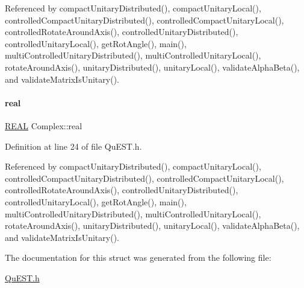 Referenced by compact\+Unitary\+Distributed(), compact\+Unitary\+Local(), controlled\+Compact\+Unitary\+Distributed(), controlled\+Compact\+Unitary\+Local(), controlled\+Rotate\+Around\+Axis(), controlled\+Unitary\+Distributed(), controlled\+Unitary\+Local(), get\+Rot\+Angle(), main(), multi\+Controlled\+Unitary\+Distributed(), multi\+Controlled\+Unitary\+Local(), rotate\+Around\+Axis(), unitary\+Distributed(), unitary\+Local(), validate\+Alpha\+Beta(), and validate\+Matrix\+Is\+Unitary().

\mbox{\label{structComplex_a479ad939835457595fcca3ca55c06283}} 
\paragraph{\texorpdfstring{real}{real}}
{\footnotesize\ttfamily \mbox{\hyperlink{QuEST__precision_8h_a4b654506f18b8bfd61ad2a29a7e38c25}{R\+E\+AL}} Complex\+::real}



Definition at line 24 of file Qu\+E\+S\+T.\+h.



Referenced by compact\+Unitary\+Distributed(), compact\+Unitary\+Local(), controlled\+Compact\+Unitary\+Distributed(), controlled\+Compact\+Unitary\+Local(), controlled\+Rotate\+Around\+Axis(), controlled\+Unitary\+Distributed(), controlled\+Unitary\+Local(), get\+Rot\+Angle(), main(), multi\+Controlled\+Unitary\+Distributed(), multi\+Controlled\+Unitary\+Local(), rotate\+Around\+Axis(), unitary\+Distributed(), unitary\+Local(), validate\+Alpha\+Beta(), and validate\+Matrix\+Is\+Unitary().



The documentation for this struct was generated from the following file\+:\begin{DoxyCompactItemize}
\item 
\mbox{\hyperlink{QuEST_8h}{Qu\+E\+S\+T.\+h}}\end{DoxyCompactItemize}
